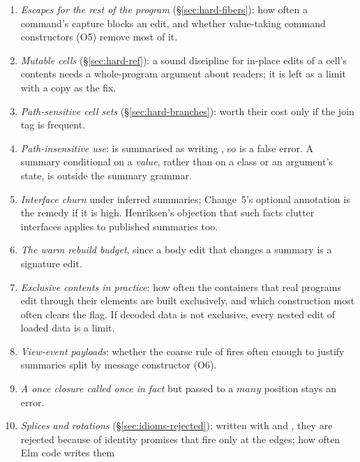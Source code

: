 \begin{enumerate}
written (\S\ref{sec:soundness-gaps}); monotonicity is checked case by case but not written out, and fails
for one component; nothing is mechanised; the once-closure, entry and write-set lemmas are the newest parts
and the least tested; and the write-set lemma rests on that analysis's own soundness argument, which is also
a sketch.
\item \emph{Escapes for the rest of the program} (\S\ref{sec:hard-fibers}): how often a command's capture
blocks an edit, and whether value-taking command constructors (O5) remove most of it.
\item \emph{Mutable cells} (\S\ref{sec:hard-ref}): a sound discipline for in-place edits of a cell's
contents needs a whole-program argument about readers; it is left as a limit with a copy as the fix.
\item \emph{Path-sensitive cell sets} (\S\ref{sec:hard-branches}): worth their cost only if the join tag is
frequent.
\item \emph{Path-insensitive use}:  is summarised as writing , so  is a false error.
A summary conditional on a \emph{value}, rather than on a class or an argument's state, is outside the
summary grammar.
\item \emph{Interface churn} under inferred summaries; Change~5's optional annotation is the remedy if it
is high. Henriksen's objection that such facts clutter interfaces applies to published summaries too.
\item \emph{The warm rebuild budget}, since a body edit that changes a summary is a signature edit.
\item \emph{Exclusive contents in practice}: how often the containers that real programs edit through
their elements are built exclusively, and which construction most often clears the flag. If decoded
data is not exclusive, every nested edit of loaded data is a limit.
\item \emph{View-event payloads}: whether the coarse rule of  fires often enough to justify
summaries split by message constructor (O6).
\item \emph{A once closure called once in fact} but passed to a $\mathit{many}$ position stays an error.
\item \emph{Splices and rotations} (\S\ref{sec:idioms-rejected}): written with  and ,
they are rejected because of identity promises that fire only at the edges; how often Elm code writes them

\end{enumerate}
